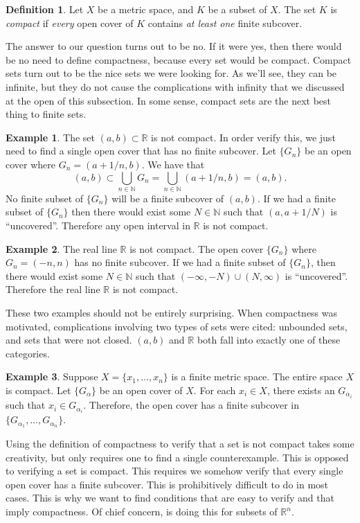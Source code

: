 \documentclass{article}
\newcommand{\N}{\mathbb{N}}
\newcommand{\R}{\mathbb{R}}
\theoremstyle{definition}
\newtheorem{definition}{Definition}[section]
\newtheorem{example}{Example}[section]
\begin{document}
\begin{definition}
	Let $ X $ be a metric space, and $ K $ be a subset of $ X $. The set $ K $ is \textit{\color{red}compact} if \textit{every} open cover of $ K $ contains \textit{at least one} finite subcover. 
\end{definition} 
The answer to our question turns out to be no. If it were yes, then there would be no need to define compactness, because every set would be compact. Compact sets turn out to be the nice sets we were looking for. As we'll see, they can be infinite, but they do not cause the complications with infinity that we discussed at the open of this subsection. In some sense, compact sets are the next best thing to finite sets. 
\begin{example}
	The set $ (a,b)\subset\R $ is not compact. In order verify this, we just need to find a single open cover that has no finite subcover. Let $ \{G_n\} $ be an open cover where $ G_n=(a+1/n,b) $. We have that $$ (a,b)\subset\bigcup_{n\in \N} G_n=\bigcup_{n\in \N}(a+1/n,b)=(a,b).$$ No finite subset of $ \{G_n\} $ will be a finite subcover of $ (a,b) $. If we had a finite subset of $ \{G_n\} $ then there would exist some $ N\in\N $ such that $ (a,a+1/N) $ is ``uncovered''. Therefore any open interval in $ \R $ is not compact. 
\end{example}
\begin{example}
	The real line $ \R $ is not compact. The open cover $ \{G_n\} $ where $ G_n=(-n,n) $ has no finite subcover. If we had a finite subset of $ \{G_n\} $, then there would exist some $ N\in\N $ such that $ (-\infty,-N)\cup(N,\infty) $ is ``uncovered''. Therefore the real line $ \R $ is not compact. 
\end{example}

These two examples should not be entirely surprising. When compactness was motivated, complications involving two types of sets were cited: unbounded sets, and sets that were not closed. $ (a,b) $ and $ \R $ both fall into exactly one of these categories.
\begin{example}
	Suppose $ X=\{x_1,\ldots,x_n\} $ is a finite metric space. The entire space $ X $ is compact. Let $ \{G_\alpha\} $ be an open cover of $ X $. For each $ x_i\in X $, there exists an $ G_{\alpha_i} $ such that $ x_i\in G_{\alpha_i} $. Therefore, the open cover has a finite subcover in $ \{G_{\alpha_1},\ldots ,G_{\alpha_n}\} $.    
\end{example}
Using the definition of compactness to verify that a set is not compact takes some creativity, but only requires one to find a single counterexample. This is opposed to verifying a set is compact. This requires we somehow verify that every single open cover has a finite subcover. This is prohibitively difficult to do in most cases. This is why we want to find conditions that are easy to verify and that imply compactness. Of chief concern, is doing this for subsets of $ \R^n $. 
\end{document}

